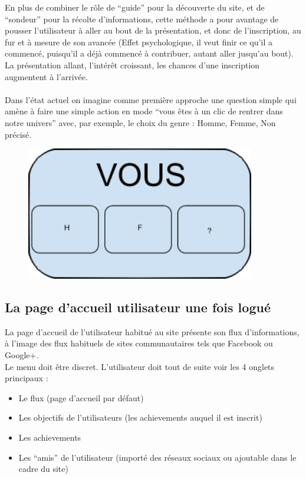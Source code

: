 \documentclass{life-fr}
\begin{document}
En plus de combiner le rôle de “guide” pour la découverte du site, et de “sondeur” pour la récolte d'informations, cette méthode a pour avantage de pousser l'utilisateur à aller au bout de la présentation, et donc de l'inscription, au fur et à mesure de son avancée (Effet psychologique, il veut finir ce qu'il a commencé, puisqu'il a déjà commencé à contribuer, autant aller jusqu'au bout). La présentation allant, l'intérêt croissant, les chances d'une inscription augmentent à l'arrivée.\\
\\

Dans l'état actuel on imagine comme première approche une question simple qui amène à faire une simple action en mode ``vous êtes à un clic de rentrer dans notre univers'' avec, par exemple, le choix du genre : Homme, Femme, Non précisé.

\begin{figure}[H]
  \begin{center}
    \includegraphics[width=10cm]{img/vous.png}
  \end{center}
\end{figure}

\subsection{La page d'accueil utilisateur une fois logué}

La page d'accueil de l'utilisateur habitué au site présente son flux d'informations, à l'image des flux habituels de sites communautaires tels que Facebook ou Google+. \\

Le menu doit être discret. L'utilisateur doit tout de suite voir les 4 onglets principaux :

\begin{itemize}
  \item Le flux (page d'accueil par défaut)
  \item Les objectifs de l'utilisateurs (les achievements auquel il est inscrit)
  \item Les achievements
  \item Les “amis” de l'utilisateur (importé des réseaux sociaux ou ajoutable dans le cadre du site)
\end{itemize}
\end{document}
